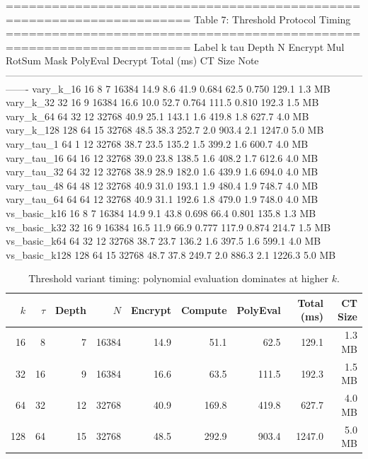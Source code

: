 ======================================================================
  Table 7: Threshold Protocol Timing
======================================================================
          Label    k  tau  Depth      N  Encrypt   Mul  RotSum   Mask  PolyEval  Decrypt  Total (ms)  CT Size  Note
-------------------------------------------------------------------------------------------------------------------
      vary_k_16   16    8      7  16384     14.9   8.6    41.9  0.684      62.5    0.750       129.1   1.3 MB      
      vary_k_32   32   16      9  16384     16.6  10.0    52.7  0.764     111.5    0.810       192.3   1.5 MB      
      vary_k_64   64   32     12  32768     40.9  25.1   143.1    1.6     419.8      1.8       627.7   4.0 MB      
     vary_k_128  128   64     15  32768     48.5  38.3   252.7    2.0     903.4      2.1      1247.0   5.0 MB      
     vary_tau_1   64    1     12  32768     38.7  23.5   135.2    1.5     399.2      1.6       600.7   4.0 MB      
    vary_tau_16   64   16     12  32768     39.0  23.8   138.5    1.6     408.2      1.7       612.6   4.0 MB      
    vary_tau_32   64   32     12  32768     38.9  28.9   182.0    1.6     439.9      1.6       694.0   4.0 MB      
    vary_tau_48   64   48     12  32768     40.9  31.0   193.1    1.9     480.4      1.9       748.7   4.0 MB      
    vary_tau_64   64   64     12  32768     40.9  31.1   192.6    1.8     479.0      1.9       748.0   4.0 MB      
   vs_basic_k16   16    8      7  16384     14.9   9.1    43.8  0.698      66.4    0.801       135.8   1.3 MB      
   vs_basic_k32   32   16      9  16384     16.5  11.9    66.9  0.777     117.9    0.874       214.7   1.5 MB      
   vs_basic_k64   64   32     12  32768     38.7  23.7   136.2    1.6     397.5      1.6       599.1   4.0 MB      
  vs_basic_k128  128   64     15  32768     48.7  37.8   249.7    2.0     886.3      2.1      1226.3   5.0 MB      

\begin{table}[t]
\centering
\caption{Threshold variant timing: polynomial evaluation dominates at higher $k$.}
\label{tab:threshold-timing}
\begin{tabular}{rrrrrrrrr}
\toprule
$k$ & $\tau$ & Depth & $N$ & Encrypt & Compute & PolyEval & Total (ms) & CT Size \\
\midrule
16 & 8 & 7 & 16384 & 14.9 & 51.1 & 62.5 & 129.1 & 1.3 MB \\
32 & 16 & 9 & 16384 & 16.6 & 63.5 & 111.5 & 192.3 & 1.5 MB \\
64 & 32 & 12 & 32768 & 40.9 & 169.8 & 419.8 & 627.7 & 4.0 MB \\
128 & 64 & 15 & 32768 & 48.5 & 292.9 & 903.4 & 1247.0 & 5.0 MB \\
\bottomrule
\end{tabular}
\end{table}


